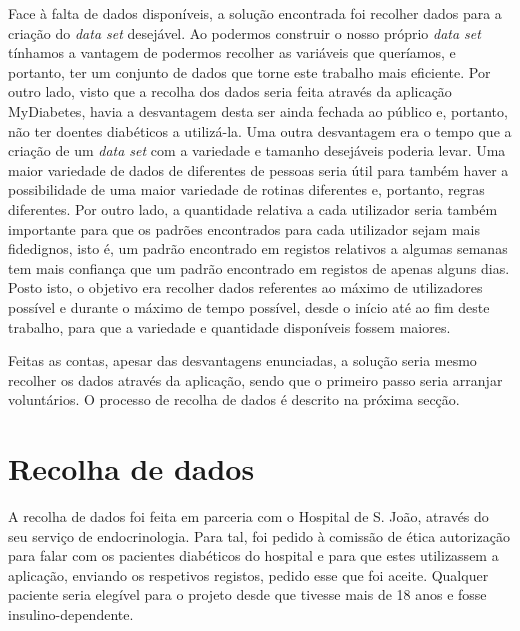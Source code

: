 Face à falta de dados disponíveis, a solução encontrada foi recolher dados para a criação do \textit{data set} desejável. Ao podermos construir o nosso próprio \textit{data set} tínhamos a vantagem de podermos recolher as variáveis que queríamos, e portanto, ter um conjunto de dados que torne este trabalho mais eficiente. Por outro lado, visto que a recolha dos dados seria feita através da aplicação MyDiabetes, havia a desvantagem desta ser ainda fechada ao público e, portanto, não ter doentes diabéticos a utilizá-la. Uma outra desvantagem era o tempo que a criação de um \textit{data set} com a variedade e tamanho desejáveis poderia levar. Uma maior variedade de dados de diferentes de pessoas seria útil para também haver a possibilidade de uma maior variedade de rotinas diferentes e, portanto, regras diferentes. Por outro lado, a quantidade relativa a cada utilizador seria também importante para que os padrões encontrados para cada utilizador sejam mais fidedignos, isto é, um padrão encontrado em registos relativos a algumas semanas tem mais confiança que um padrão encontrado em registos de apenas alguns dias. Posto isto, o objetivo era recolher dados referentes ao máximo de utilizadores possível e durante o máximo de tempo possível, desde o início até ao fim deste trabalho, para que a variedade e quantidade disponíveis fossem maiores.

Feitas as contas, apesar das desvantagens enunciadas, a solução seria mesmo recolher os dados através da aplicação, sendo que o primeiro passo seria arranjar voluntários. O processo de recolha de dados é descrito na próxima secção.

\section{Recolha de dados}

A recolha de dados foi feita em parceria com o Hospital de S. João, através do seu serviço de endocrinologia. Para tal, foi pedido à comissão de ética autorização para falar com os pacientes diabéticos do hospital e para que estes utilizassem a aplicação, enviando os respetivos registos, pedido esse que foi aceite. Qualquer paciente seria elegível para o projeto desde que tivesse mais de 18 anos e fosse insulino-dependente. 

